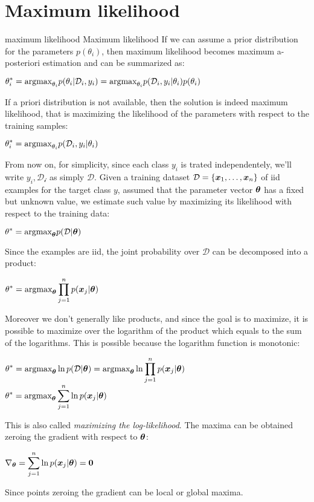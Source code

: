 \section{Maximum likelihood}
\label{sec:MaximumLikelihood}
\newcommand{\maxl}{0}{maximum likelihood}
\newcommand{\Maxl}{0}{Maximum likelihood}
If we can assume a prior distribution for the parameters $p(\theta_i)$, then maximum likelihood becomes maximum a-posteriori estimation and can be summarized as:
\begin{center}
	$\displaystyle \theta^*_i=\text{argmax}_{\theta_i}p(\theta_i\vert\mathcal{D}_i,y_i)=\text{argmax}_{\theta_i}p(\mathcal{D}_i,y_i\vert \theta_i)p(\theta_i)$
\end{center}
If a priori distribution is not available, then the solution is indeed maximum likelihood, that is maximizing the likelihood of the parameters with respect to the training samples:
\begin{center}
	$\displaystyle \theta_i^*=\text{argmax}_{\theta_i}p(\mathcal{D}_i,y_i\vert\theta_i)$
\end{center}
From now on, for simplicity, since each class $y_i$ is trated independentely, we'll write $y_i, \mathcal{D_i}$ as simply $\mathcal{D}$.\newline
Given a training dataset $\mathcal{D}=\{\bm{x}_1,\hdots,\bm{x}_n\}$ of iid examples for the target class $y$, assumed that the parameter vector $\bm{\theta}$ has a fixed but unknown value, we estimate such value by maximizing its likelihood with respect to the training data:
\begin{center}
	$\displaystyle \theta^*=\text{argmax}_{\bm{\theta}}p(\mathcal{D}\vert\bm{\theta})$
\end{center}
Since the examples are iid, the joint probability over $\mathcal{D}$ can be decomposed into a product:
\begin{center}
	$\displaystyle \theta^*=\text{argmax}_{\bm{\theta}}\displaystyle\prod_{j=1}^np(\bm{x}_j\vert\bm{\theta})$
\end{center}
Moreover we don't generally like products, and since the goal is to maximize, it is possible to maximize over the logarithm of the product which equals to the sum of the logarithms. This is possible because the logarithm function is monotonic:
\begin{center}
	$\displaystyle \theta^*=\text{argmax}_{\bm{\theta}}\ln{p(\mathcal{D}\vert\bm{\theta})}=\text{argmax}_{\bm{\theta}}\ln{\displaystyle\prod_{j=1}^np(\bm{x}_j\vert\bm{\theta})}$\\
	\vspace{0.3cm}
	$\displaystyle \theta^*=\text{argmax}_{\bm{\theta}}\displaystyle\sum_{j=1}^n\ln{p(\bm{x}_j\vert\bm{\theta})}$\\
\end{center}
This is also called \textit{maximizing the log-likelihood}. \newline
The maxima can be obtained zeroing the gradient with respect to $\bm{\theta}$:
\begin{center}
	$\displaystyle \nabla_{\bm{\theta}}=\displaystyle\sum_{j=1}^n\ln{p(\bm{x}_j\vert\bm{\theta})}=\bm{0}$
\end{center}
Since points zeroing the gradient can be local or global maxima.\newline
%
%
